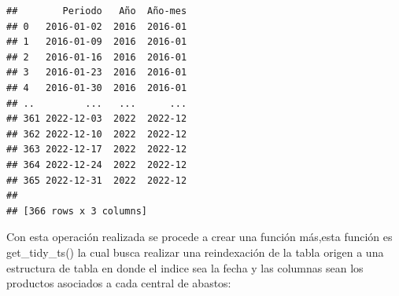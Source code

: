 \documentclass[
]{book}
\begin{document}
\begin{verbatim}
##        Periodo   Año  Año-mes
## 0   2016-01-02  2016  2016-01
## 1   2016-01-09  2016  2016-01
## 2   2016-01-16  2016  2016-01
## 3   2016-01-23  2016  2016-01
## 4   2016-01-30  2016  2016-01
## ..         ...   ...      ...
## 361 2022-12-03  2022  2022-12
## 362 2022-12-10  2022  2022-12
## 363 2022-12-17  2022  2022-12
## 364 2022-12-24  2022  2022-12
## 365 2022-12-31  2022  2022-12
## 
## [366 rows x 3 columns]
\end{verbatim}

Con esta operación realizada se procede a crear una función más,esta función es get\_tidy\_ts() la cual busca realizar una reindexación de la tabla origen a una estructura de tabla en donde el indice sea la fecha y las columnas sean los productos asociados a cada central de abastos:
\end{document}
